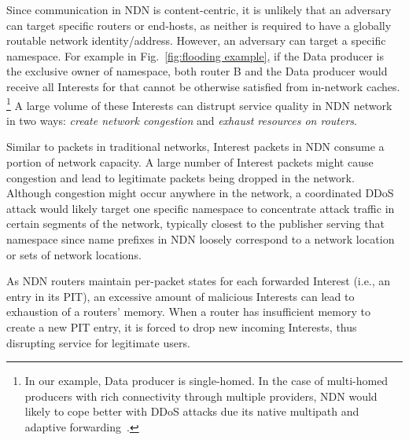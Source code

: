 Since communication in NDN is content-centric, it is unlikely that an adversary can target specific routers or end-hosts, as neither is required to have a globally routable network identity/address. However, an adversary can target a specific namespace.
For example in Fig.~\ref{fig:flooding example}, if the Data producer is the exclusive owner of  namespace, both router B and the Data producer would receive all Interests for  that cannot be otherwise satisfied from in-network caches.%
\footnote {In our example, Data producer is single-homed. In the case of multi-homed producers with rich connectivity through multiple providers, NDN would likely to cope better with DDoS attacks due its native multipath and adaptive forwarding~\cite{adaptive-forwarding}.}
A large volume of these Interests can distrupt service quality in NDN network in two ways: \emph{create network congestion} and \emph{exhaust resources on routers}.

Similar to packets in traditional networks, Interest packets in NDN consume a portion of network capacity. A large number of Interest packets might cause congestion and lead to legitimate packets being dropped in the network. Although congestion might occur anywhere in the network, a coordinated DDoS attack would likely target one specific namespace to concentrate attack traffic in certain segments of the network, typically closest to the publisher serving that namespace since name prefixes in NDN loosely correspond to a network location or sets of network locations. 

As NDN routers maintain per-packet states for each forwarded Interest (i.e., an entry in its PIT), an excessive amount of malicious Interests can lead to exhaustion of a routers' memory. When a router has insufficient memory to create a new PIT entry, it is forced to drop new incoming Interests, thus disrupting service for legitimate users.




